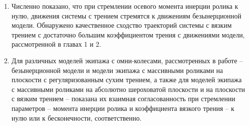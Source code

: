 \begin{enumerate}
        \item {
            Численно показано, что при стремлении осевого момента инерции ролика к нулю, движения системы с трением стремятся к движениям безынерционной модели. Обнаружено качественное сходство траекторий системы с вязким трением с достаточно большим коэффициентом трения с движениями модели, рассмотренной в главах 1 и 2.
        }

        \item {
            Для различных моделей экипажа с омни-колесами, рассмотренных в работе -- безынерционной модели и модели экипажа с массивными роликами на плоскости с регуляризованным сухим трением, а также для моделей экипажа с массивными роликами на абсолютно шероховатой плоскости и на плоскости с вязким трением -- показана их взаимная согласованность
            при стремлении параметров -- момента инерции ролика и коэффициента вязкого трения -- к нулю или к бесконечности, соответственно.
        }
        






\end{enumerate}